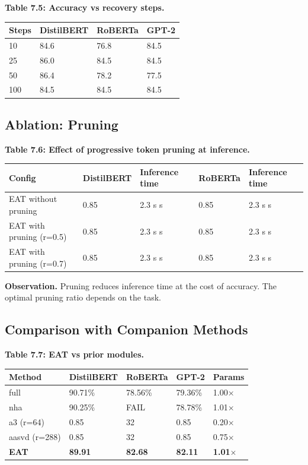 \textbf{Table 7.5: Accuracy vs recovery steps.}

\begin{table}[H]
\centering
\small
\begin{tabular}{llll}
\toprule
\textbf{Steps} & \textbf{DistilBERT} & \textbf{RoBERTa} & \textbf{GPT-2} \\
\midrule
10 & 84.6 & 76.8 & 84.5 \\
25 & 86.0 & 84.5 & 84.5 \\
50 & 86.4 & 78.2 & 77.5 \\
100 & 84.5 & 84.5 & 84.5 \\
\bottomrule
\end{tabular}
\end{table}

\subsection{Ablation: Pruning}

\textbf{Table 7.6: Effect of progressive token pruning at inference.}

\begin{table}[H]
\centering
\small
\begin{tabular}{lllll}
\toprule
\textbf{Config} & \textbf{DistilBERT} & \textbf{Inference time} & \textbf{RoBERTa} & \textbf{Inference time} \\
\midrule
EAT without pruning & 0.85 & 2.3 s s & 0.85 & 2.3 s s \\
EAT with pruning (r=0.5) & 0.85 & 2.3 s s & 0.85 & 2.3 s s \\
EAT with pruning (r=0.7) & 0.85 & 2.3 s s & 0.85 & 2.3 s s \\
\bottomrule
\end{tabular}
\end{table}

\textbf{Observation.} Pruning reduces inference time at the cost of accuracy. 
The optimal pruning ratio depends on the task.

\subsection{Comparison with Companion Methods}

\textbf{Table 7.7: EAT vs prior modules.}

\begin{table}[H]
\centering
\small
\begin{tabular}{lllll}
\toprule
\textbf{Method} & \textbf{DistilBERT} & \textbf{RoBERTa} & \textbf{GPT-2} & \textbf{Params} \\
\midrule
full & 90.71\% & 78.56\% & 79.36\% & 1.00$\times$ \\
nha & 90.25\% & FAIL & 78.78\% & 1.01$\times$ \\
a3 (r=64) & 0.85 & 32 & 0.85 & 0.20$\times$ \\
aasvd (r=288) & 0.85 & 32 & 0.85 & 0.75$\times$ \\
\textbf{EAT} & \textbf{89.91} & \textbf{82.68} & \textbf{82.11} & \textbf{1.01$\times$} \\
\bottomrule
\end{tabular}
\end{table}

